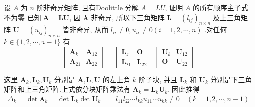   \begin{tcolorbox}[enhanced,colback=10,colframe=9,breakable,coltitle=green!25!black,title=2024]
  
   设 $ A $ 为 $n$ 阶非奇异矩阵, 且有Doolittle 分解 $ A=L U $, 证明 $ A $ 的所有顺序主子式不为零
\tcblower
 已知 $ \boldsymbol{A}=\boldsymbol{L} \boldsymbol{U} $, 因 $ \boldsymbol{A} $ 非奇异, 所以下三角矩阵 $ \boldsymbol{L}=\left(l_{i j}\right)_{n \times n} $ 及上三角矩阵 $ \boldsymbol{U}=\left(u_{i j}\right)_{n \times n} $ 皆非奇异, 从而 $ l_{i i} \neq 0, u_{i i} \neq 0(i=1,2, \cdots, n) $ .对任何 $ k \in\{1,2, \cdots, n-1\} $ 有
$$
\left[\begin{array}{ll}
\boldsymbol{A}_{k} & \boldsymbol{A}_{12} \\
\boldsymbol{A}_{21} & \boldsymbol{A}_{22}
\end{array}\right]=\left[\begin{array}{cc}
\boldsymbol{L}_{k} & \boldsymbol{O} \\
\boldsymbol{L}_{21} & \boldsymbol{L}_{22}
\end{array}\right]\left[\begin{array}{cc}
\boldsymbol{U}_{k} & \boldsymbol{U}_{12} \\
\boldsymbol{O} & \boldsymbol{U}_{22}
\end{array}\right]
$$

这里 $ \boldsymbol{A}_{k}, \boldsymbol{L}_{k}, \boldsymbol{U}_{k} $ 分别是 $ \boldsymbol{A}, \boldsymbol{L}, \boldsymbol{U} $ 的左上角 $k $ 阶子块, 并且 $ \boldsymbol{L}_{k} $ 和 $ \boldsymbol{U}_{k} $ 分别是下三角矩阵和上三角矩阵.上式依分块矩阵乘法有 $ \boldsymbol{A}_{k}=\boldsymbol{L}_{k} \boldsymbol{U}_{k} $, 因此推得
$$
\begin{aligned}
\Delta_{k}=\operatorname{det} \boldsymbol{A}_{k}=\operatorname{det} \boldsymbol{L}_{k} \operatorname{det} \boldsymbol{U}_{k}= & l_{11} l_{22} \cdots l_{kk} u_{11} \cdots u_{kk} \neq 0 \quad (k=1,2, \cdots, n-1)
\end{aligned}
$$

\end{tcolorbox}

